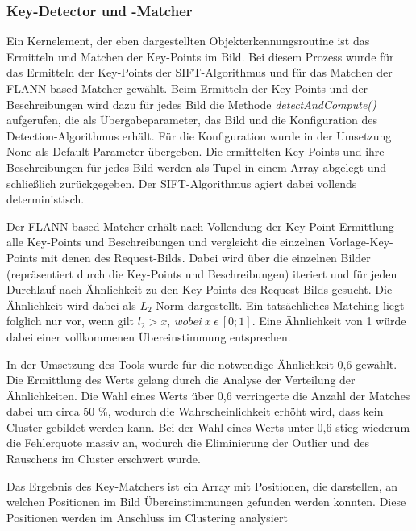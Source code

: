 \documentclass[
    type=Projektarbeit,
    status=draft, %
    language=german, %
    bibengine=bibtex,
]{unibwm-inf-thesis}
\begin{document}
    \subsubsection{Key-Detector und -Matcher} \label{subsubsec:Key-Detector-Matcher}
    Ein Kernelement, der eben dargestellten Objekterkennungsroutine ist das Ermitteln und Matchen der Key-Points im Bild.
    Bei diesem Prozess wurde für das Ermitteln der Key-Points der SIFT-Algorithmus und für das Matchen der FLANN-based Matcher gewählt.
    Beim Ermitteln der Key-Points und der Beschreibungen wird dazu für jedes Bild die Methode \textit{detectAndCompute()} aufgerufen, die als Übergabeparameter, das Bild und die Konfiguration des Detection-Algorithmus erhält.
    Für die Konfiguration wurde in der Umsetzung None als Default-Parameter übergeben.
    Die ermittelten Key-Points und ihre Beschreibungen für jedes Bild werden als Tupel in einem Array abgelegt und schließlich zurückgegeben.
    Der SIFT-Algorithmus agiert dabei vollends deterministisch.

    Der FLANN-based Matcher erhält nach Vollendung der Key-Point-Ermittlung alle Key-Points und Beschreibungen und vergleicht die einzelnen Vorlage-Key-Points mit denen des Request-Bilds.
    Dabei wird über die einzelnen Bilder (repräsentiert durch die Key-Points und Beschreibungen) iteriert und für jeden Durchlauf nach Ähnlichkeit zu den Key-Points des Request-Bilds gesucht.
    Die Ähnlichkeit wird dabei als $L_{2}$-Norm dargestellt.
    Ein tatsächliches Matching liegt folglich nur vor, wenn gilt $l_{2} > x,~wobei~x~\epsilon~[0; 1]$.
    Eine Ähnlichkeit von 1 würde dabei einer vollkommenen Übereinstimmung entsprechen.

    In der Umsetzung des Tools wurde für die notwendige Ähnlichkeit 0,6 gewählt.
    Die Ermittlung des Werts gelang durch die Analyse der Verteilung der Ähnlichkeiten.
    Die Wahl eines Werts über 0,6 verringerte die Anzahl der Matches dabei um circa 50 \%, wodurch die Wahrscheinlichkeit erhöht wird, dass kein Cluster gebildet werden kann.
    Bei der Wahl eines Werts unter 0,6 stieg wiederum die Fehlerquote massiv an, wodurch die Eliminierung der Outlier und des Rauschens im Cluster erschwert wurde.

    Das Ergebnis des Key-Matchers ist ein Array mit Positionen, die darstellen, an welchen Positionen im Bild Übereinstimmungen gefunden werden konnten.
    Diese Positionen werden im Anschluss im Clustering analysiert
\end{document}
